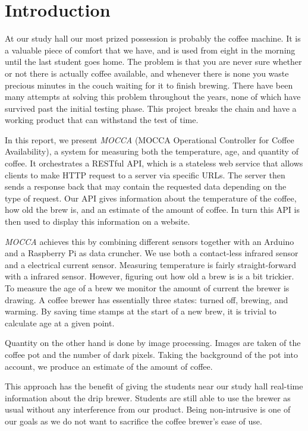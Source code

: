 \documentclass[12pt,a4paper,oneside,article]{memoir}
\numberwithin{equation}{chapter}
\begin{document}
\section{Introduction}\label{sec:introduction}
At our study hall our most prized possession is probably the coffee 
machine. It is a valuable piece of comfort that we have, and is used from eight 
in the morning until the last student goes home. The problem is that you are 
never sure whether or not there is actually coffee available, and whenever there 
is none you waste precious minutes in the couch waiting for it to finish 
brewing. There have been many attempts at solving this problem throughout the 
years, none of which have survived past the initial testing phase. This project 
breaks the chain and have a working product that can withstand the test of time.

In this report, we present \textit{MOCCA} (MOCCA Operational Controller for 
Coffee Availability), a system for measuring both the temperature, age, and 
quantity of coffee. It orchestrates a RESTful API, which is a stateless 
web service that allows clients to make HTTP request to a server via 
specific URLs. The server then sends a response back that may contain the 
requested data depending on the type of request. Our API gives information 
about the temperature of the coffee, how old the brew is, and an estimate of 
the amount of coffee. In turn this API is then used to display this information 
on a website.

\textit{MOCCA} achieves this by combining different sensors together with an 
Arduino and a Raspberry Pi as data cruncher. We use both a contact-less 
infrared sensor and a electrical current sensor. Measuring temperature is 
fairly straight-forward with a infrared sensor. However, figuring out how old a 
brew is is a bit trickier. To measure the age of a brew we monitor the amount 
of current the brewer is drawing. A coffee brewer has essentially three states: 
turned off, brewing, and warming. By saving time stamps at the start of a new 
brew, it is trivial to calculate age at a given point. 

Quantity on the other hand is done by image processing. Images are taken of the
coffee pot and the number of dark pixels. Taking the background of the pot into 
account, we produce an estimate of the amount of coffee.

This approach has the benefit of giving the students near our study hall 
real-time information about the drip brewer. Students are still able to use the 
brewer as usual without any interference from our product. Being non-intrusive 
is one of our goals as we do not want to sacrifice the coffee brewer's ease 
of use.
\end{document}
